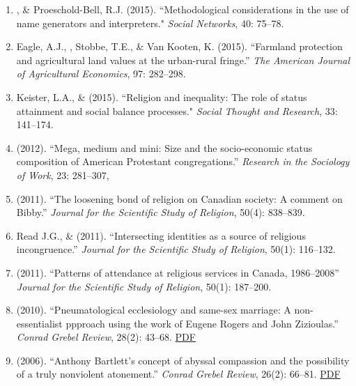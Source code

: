 \begin{enumerate}
\item \Eagle, \& Proeschold-Bell, R.J. (2015). ``Methodological considerations in the use of name generators and interpreters." \emph{Social Networks}, 40: 75--78. 

\item Eagle, A.J., \Eagle, Stobbe, T.E., \& Van Kooten, K. (2015). ``Farmland protection and agricultural land values at the urban-rural fringe.'' \emph{The American Journal of Agricultural Economics}, 97: 282--298. 

\item Keister, L.A., \& \Eagle \hspace{.01em} (2015). ``Religion and inequality: The role of status attainment and social balance processes." \emph{Social Thought and Research}, 33: 141--174.

\item \Eagle \hspace{.01em} (2012). ``Mega, medium and mini: Size and the socio-economic status composition of American Protestant congregations.'' \emph{Research in the Sociology of Work}, 23:  281--307, 

\item \Eagle \hspace{.01em} (2011). ``The loosening bond of religion on Canadian society: A comment on Bibby.'' \emph{Journal for the Scientific Study of Religion}, 50(4): 838--839.

\item Read J.G., \& \Eagle \hspace{.01em} (2011). ``Intersecting identities as a source of religious incongruence.''  \emph{Journal for the Scientific Study of Religion}, 50(1): 116--132. 

\item \Eagle \hspace{.01em} (2011). ``Patterns of attendance at religious services in Canada, 1986--2008'' \emph{Journal for the Scientific Study of Religion}, 50(1): 187--200. 

\item \Eagle \hspace{.01em} (2010). ``Pneumatological ecclesiology and same-sex marriage: A non-essentialist ppproach using the work of Eugene Rogers and John Zizioulas.'' \emph{Conrad Grebel Review}, 28(2): 43--68. \href{https://www.davideagle.org/publication/eagle-pneumatological-ecclesiology-samesex-2010/eagle-pneumatological-ecclesiology-samesex-2010.pdf}{PDF}

\item \Eagle\hspace{.01em} (2006). ``Anthony Bartlett's concept of abyssal compassion and the possibility of a truly nonviolent atonement.'' \emph{Conrad Grebel Review}, 26(2): 66--81. \href{https://www.davideagle.org/publication/eagle-anthony-bartlett-concept-2006/eagle-anthony-bartlett-concept-2006.pdf}{PDF}

\end{enumerate}

